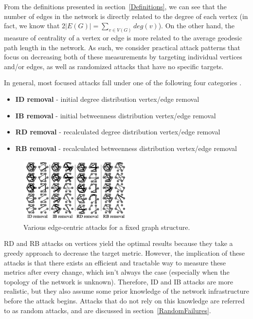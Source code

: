 \documentclass[11pt]{article}
\begin{document}
From the definitions presented in section~\ref{Definitions}, we can see that the number of edges in the network is directly related to the degree of each vertex (in fact, we know that $2|E(G)| =\sum_{v \in V(G)}deg(v)$). On the other hand, the measure of centrality of a vertex or edge is more related to the average geodesic path length in the network. As such, we consider practical attack patterns that focus on decreasing both of these measurements by targeting individual vertices and/or edges, as well as randomized attacks that have no specific targets. 

In general, most focused attacks fall under one of the following four categories \cite{Attacks}.
\begin{itemize}
	\item \textbf{ID removal} - initial degree distribution vertex/edge removal
	\item \textbf{IB removal} - initial betweenness distribution vertex/edge removal
	\item \textbf{RD removal} - recalculated degree distribution vertex/edge removal
	\item \textbf{RB removal} - recalculated betweenness distribution vertex/edge removal
\end{itemize}

\begin{figure}[h!]
	\label{fig:Onion}
	\centering
		\includegraphics[width=0.5\textwidth]{edge_attacks.png}
	\caption{Various edge-centric attacks for a fixed graph structure.}
\end{figure}

RD and RB attacks on vertices yield the optimal results because they take a greedy approach to decrease the target metric. However, the implication of these attacks is that there exists an efficient and tractable way to measure these metrics after every change, which isn't always the case (especially when the topology of the network is unknown). Therefore, ID and IB attacks are more realistic, but they also assume some prior knowledge of the network infrastructure before the attack begins. Attacks that do not rely on this knowledge are referred to as random attacks, and are discussed in section~\ref{RandomFailures}.
\end{document}
